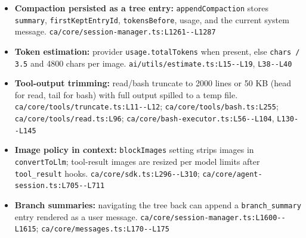 \begin{itemize}
\item \textbf{Compaction persisted as a tree entry:} \texttt{appendCompaction} stores \texttt{summary}, \texttt{firstKeptEntryId}, \texttt{tokensBefore}, usage, and the current system message. \texttt{ca/\allowbreak{}core/\allowbreak{}session-\allowbreak{}manager.\allowbreak{}ts:\allowbreak{}L1261-\allowbreak{}-\allowbreak{}L1287}
\item \textbf{Token estimation:} provider \texttt{usage.\allowbreak{}totalTokens} when present, else \texttt{chars /\allowbreak{} 3.\allowbreak{}5} and 4800 chars per image. \texttt{ai/\allowbreak{}utils/\allowbreak{}estimate.\allowbreak{}ts:\allowbreak{}L15-\allowbreak{}-\allowbreak{}L19}, \texttt{L38-\allowbreak{}-\allowbreak{}L40}
\item \textbf{Tool-output trimming:} read/bash truncate to 2000 lines or 50 KB (head for read, tail for bash) with full output spilled to a temp file. \texttt{ca/\allowbreak{}core/\allowbreak{}tools/\allowbreak{}truncate.\allowbreak{}ts:\allowbreak{}L11-\allowbreak{}-\allowbreak{}L12}; \texttt{ca/\allowbreak{}core/\allowbreak{}tools/\allowbreak{}bash.\allowbreak{}ts:\allowbreak{}L255}; \texttt{ca/\allowbreak{}core/\allowbreak{}tools/\allowbreak{}read.\allowbreak{}ts:\allowbreak{}L96}; \texttt{ca/\allowbreak{}core/\allowbreak{}bash-\allowbreak{}executor.\allowbreak{}ts:\allowbreak{}L56-\allowbreak{}-\allowbreak{}L104}, \texttt{L130-\allowbreak{}-\allowbreak{}L145}
\item \textbf{Image policy in context:} \texttt{blockImages} setting strips images in \texttt{convertToLlm}; tool-result images are resized per model limits after \texttt{tool\_\allowbreak{}result} hooks. \texttt{ca/\allowbreak{}core/\allowbreak{}sdk.\allowbreak{}ts:\allowbreak{}L296-\allowbreak{}-\allowbreak{}L310}; \texttt{ca/\allowbreak{}core/\allowbreak{}agent-\allowbreak{}session.\allowbreak{}ts:\allowbreak{}L705-\allowbreak{}-\allowbreak{}L711}
\item \textbf{Branch summaries:} navigating the tree back can append a \texttt{branch\_\allowbreak{}summary} entry rendered as a user message. \texttt{ca/\allowbreak{}core/\allowbreak{}session-\allowbreak{}manager.\allowbreak{}ts:\allowbreak{}L1600-\allowbreak{}-\allowbreak{}L1615}; \texttt{ca/\allowbreak{}core/\allowbreak{}messages.\allowbreak{}ts:\allowbreak{}L170-\allowbreak{}-\allowbreak{}L175}
\end{itemize}

